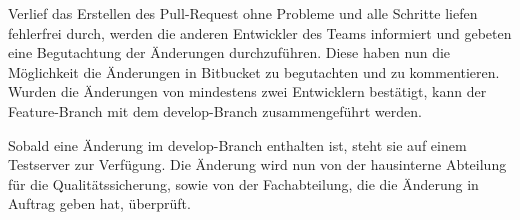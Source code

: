 Verlief das Erstellen des Pull-Request ohne Probleme und alle Schritte liefen fehlerfrei durch, werden die anderen Entwickler des Teams informiert und gebeten eine Begutachtung der Änderungen durchzuführen. Diese haben nun die Möglichkeit die Änderungen in Bitbucket zu begutachten und zu kommentieren. Wurden die Änderungen von mindestens zwei Entwicklern bestätigt, kann der Feature-Branch mit dem develop-Branch zusammengeführt werden. 

Sobald eine Änderung im develop-Branch enthalten ist, steht sie auf einem Testserver zur Verfügung. Die Änderung wird nun von der hausinterne Abteilung für die Qualitätssicherung, sowie von der Fachabteilung, die die Änderung in Auftrag geben hat, überprüft.